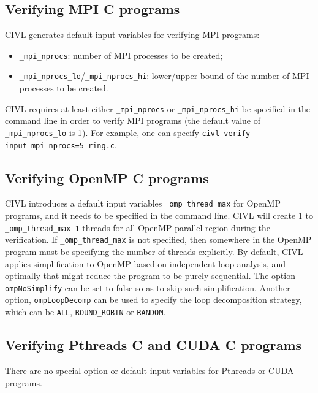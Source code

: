 \subsection{Verifying MPI C programs}
CIVL generates default input variables for verifying MPI programs:
\begin{itemize}
\item \texttt{\_mpi\_nprocs}: number of MPI processes to be created;
\item \texttt{\_mpi\_nprocs\_lo}/\texttt{\_mpi\_nprocs\_hi}: lower/upper bound of the number of MPI processes to be created.
\end{itemize}

CIVL requires at least either \texttt{\_mpi\_nprocs} or \texttt{\_mpi\_nprocs\_hi} be specified in the command line in order to verify MPI programs (the default value of \texttt{\_mpi\_nprocs\_lo} is 1). For example, one can specify  \texttt{civl verify -input\_mpi\_nprocs=5 ring.c}. 

\subsection{Verifying OpenMP C programs}
CIVL introduces a default input variables \texttt{\_omp\_thread\_max} for OpenMP programs, and it needs to be specified in the command line. CIVL will create 1 to \texttt{\_omp\_thread\_max-1} threads for all OpenMP parallel region during the verification. If \texttt{\_omp\_thread\_max} is not specified, then somewhere in the OpenMP program must be specifying the number of threads explicitly. By default, CIVL applies simplification to OpenMP based on independent loop analysis, and optimally that might reduce the program to be purely sequential. The option \texttt{ompNoSimplify} can be set to false so as to skip such simplification. Another option, \texttt{ompLoopDecomp} can be used to specify the loop decomposition strategy, which can be \texttt{ALL}, \texttt{ROUND\_ROBIN} or \texttt{RANDOM}.

\subsection{Verifying Pthreads C  and CUDA C programs}
There are no special option or default input variables for Pthreads or CUDA programs.



